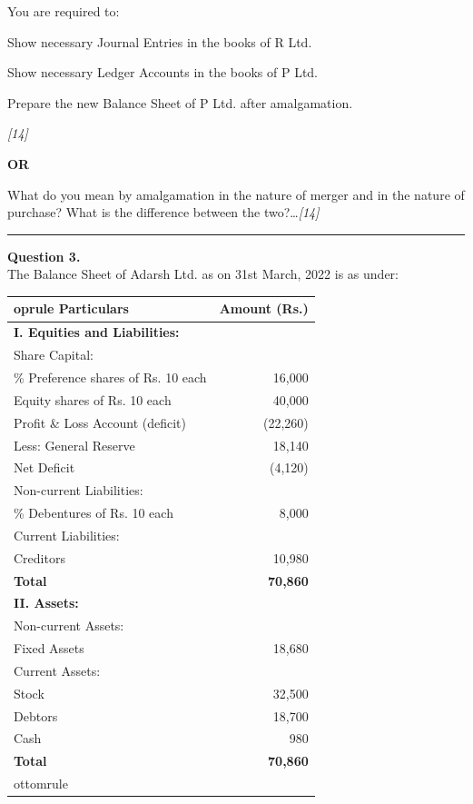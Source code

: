 \documentclass[11pt,a4paper]{article}
\newcommand{\pts}[1]{\hfill   \textit{[#1]}}
\begin{document}
You are required to:

\begin{parts}
  \item Show necessary Journal Entries in the books of R Ltd.
  \item Show necessary Ledger Accounts in the books of P Ltd.
  \item Prepare the new Balance Sheet of P Ltd. after amalgamation.
\end{parts}\pts{14}

\centerline{   \textbf{OR}}

What do you mean by amalgamation in the nature of merger and in the nature of purchase? What is the difference between the two?\dots\pts{14}

\medskip\rule{\linewidth}{0.2pt}

\pagebreak




\noindent   \textbf{Question 3.} \\
The Balance Sheet of Adarsh Ltd. as on 31st March, 2022 is as under:


\begin{table}[h!]
  \centering
  \small
  
\begin{tabular}{lr}
     oprule
   \textbf{Particulars} &   \textbf{Amount (Rs.)} \\
    \midrule
   \textbf{I. Equities and Liabilities:} & \\
    Share Capital: & \\
    \quad 7\% Preference shares of Rs. 10 each & 16,000 \\
    \quad Equity shares of Rs. 10 each & 40,000 \\
    \quad Profit \& Loss Account (deficit) & (22,260) \\
    \quad Less: General Reserve & 18,140 \\
    \quad Net Deficit & (4,120) \\
    Non-current Liabilities: & \\
    \quad 7\% Debentures of Rs. 10 each & 8,000 \\
    Current Liabilities: & \\
    \quad Creditors & 10,980 \\
    \midrule
   \textbf{Total} &   \textbf{70,860} \\
    \midrule
   \textbf{II. Assets:} & \\
    Non-current Assets: & \\
    \quad Fixed Assets & 18,680 \\
    Current Assets: & \\
    \quad Stock & 32,500 \\
    \quad Debtors & 18,700 \\
    \quad Cash & 980 \\
    \midrule
   \textbf{Total} &   \textbf{70,860} \\
    ottomrule
  \end{tabular}
\end{table}
\end{document}
